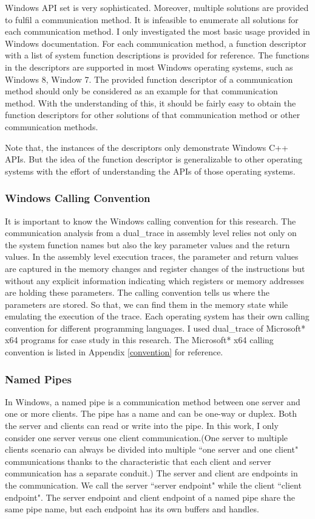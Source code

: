 Windows API set is very sophisticated. Moreover, multiple solutions are provided to fulfil a communication method. It is infeasible to enumerate all solutions for each communication method. I only investigated the most basic usage provided in Windows documentation. For each communication method, a function descriptor with a list of system function descriptions is provided for reference. The functions in the descriptors are supported in most Windows operating systems, such as Windows 8, Window 7. The provided function descriptor of a communication method should only be considered as an example for that communication method. With the understanding of this, it should be fairly easy to obtain the function descriptors for other solutions of that communication method or other communication methods. 

Note that, the instances of the descriptors only demonstrate Windows C++ APIs. But the idea of the function descriptor is generalizable to other operating systems with the effort of understanding the APIs of those operating systems.

\subsubsection{Windows Calling Convention}
It is important to know the Windows calling convention for this research. The communication analysis from a dual\_trace in assembly level relies not only on the system function names but also the key parameter values and the return values. In the assembly level execution traces, the parameter and return values are captured in the memory changes and register changes of the instructions but without any explicit information indicating which registers or memory addresses are holding these parameters. The calling convention tells us where the parameters are stored. So that, we can find them in the memory state while emulating the execution of the trace. Each operating system has their own calling convention for different programming languages. I used dual\_trace of Microsoft* x64 programs for case study in this research. The Microsoft* x64 calling convention is listed in Appendix \ref{convention} for reference.

\subsubsection{Named Pipes}
In Windows, a named pipe is a communication method between one server and one or more clients. The pipe has a name and can be one-way or duplex. Both the server and clients can read or write into the pipe.\cite{WinNamedpipe} In this work, I only consider one server versus one client communication.(One server to multiple clients scenario can always be divided into multiple ``one server and one client" communications thanks to the characteristic that each client and server communication has a separate conduit.) The server and client are endpoints in the communication. We call the server ``server endpoint" while the client ``client endpoint".  The server endpoint and client endpoint of a named pipe share the same pipe name, but each endpoint has its own buffers and handles. 

